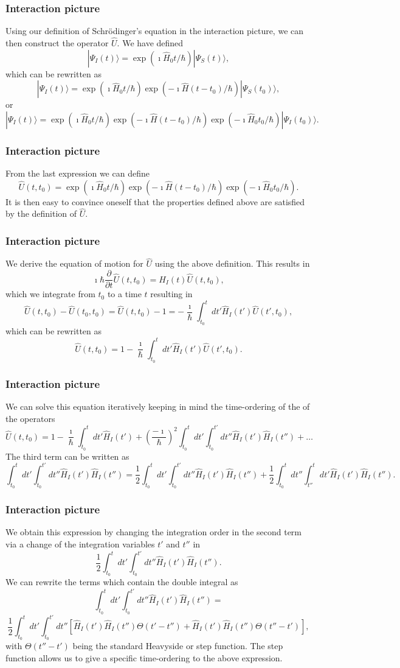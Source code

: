 \frame
{
\frametitle{Interaction picture}
\begin{small}
{\scriptsize
Using our definition of Schr\"odinger's equation in the interaction picture, we can then construct the operator $\hat{U}$. We have defined
\[
|\Psi_I(t)\rangle = \exp{(\imath\hat{H}_0t/\hbar)}|\Psi_S(t)\rangle,
\]
which can be rewritten as 
\[
|\Psi_I(t)\rangle = \exp{(\imath\hat{H}_0t/\hbar)}\exp{(-\imath\hat{H}(t-t_0)/\hbar)}|\Psi_S(t_0)\rangle,
\]
or
\[
|\Psi_I(t)\rangle = \exp{(\imath\hat{H}_0t/\hbar)}\exp{(-\imath\hat{H}(t-t_0)/\hbar)}\exp{(-\imath\hat{H}_0t_0/\hbar)}|\Psi_I(t_0)\rangle.
\]
}
\end{small}
}
\frame
{
\frametitle{Interaction picture}
\begin{small}
{\scriptsize
From the last expression we can define
\[
\hat{U}(t,t_0)=\exp{(\imath\hat{H}_0t/\hbar)}\exp{(-\imath\hat{H}(t-t_0)/\hbar)}\exp{(-\imath\hat{H}_0t_0/\hbar)}.
\]
It is then easy to convince oneself that the properties defined above are satisfied by the definition of $\hat{U}$. 
}
\end{small}
}
\frame
{
\frametitle{Interaction picture}
\begin{small}
{\scriptsize
We derive the equation of motion for $\hat{U}$ using the above definition.
This results in
\[
\imath \hbar\frac{\partial }{\partial t}\hat{U}(t,t_0) = \hat{H}_I(t)\hat{U}(t,t_0),
\]
which we integrate from $t_0$ to a time $t$ resulting in
\[
\hat{U}(t,t_0)-\hat{U}(t_0,t_0)=\hat{U}(t,t_0)-1=-\frac{\imath}{\hbar}\int_{t_0}^t dt' \hat{H}_I(t')\hat{U}(t',t_0),
\]
which can be rewritten as
\[
\hat{U}(t,t_0)=1-\frac{\imath}{\hbar}\int_{t_0}^t dt' \hat{H}_I(t')\hat{U}(t',t_0).
\]
}
\end{small}
}
\frame
{
\frametitle{Interaction picture}
\begin{small}
{\scriptsize
We can solve this equation iteratively keeping in mind the time-ordering of the of the operators
\[
\hat{U}(t,t_0)=1-\frac{\imath}{\hbar}\int_{t_0}^t dt' \hat{H}_I(t')+\left(\frac{-\imath}{\hbar}\right)^2\int_{t_0}^t dt'\int_{t_0}^{t'} dt'' \hat{H}_I(t')\hat{H}_I(t'')+\dots
\]
The third term can be written as 
\[
\int_{t_0}^t dt'\int_{t_0}^{t'} dt'' \hat{H}_I(t')\hat{H}_I(t'')=
\frac{1}{2}\int_{t_0}^t dt'\int_{t_0}^{t'} dt'' \hat{H}_I(t')\hat{H}_I(t'')
+\frac{1}{2}\int_{t_0}^t dt''\int_{t''}^{t} dt' \hat{H}_I(t')\hat{H}_I(t'').
\]
}
\end{small}
}
\frame
{
\frametitle{Interaction picture}
\begin{small}
{\scriptsize
We obtain this expression by changing the integration order in the second term
via a change of the integration variables $t'$ and $t''$  in 
\[
\frac{1}{2}\int_{t_0}^t dt'\int_{t_0}^{t'} dt'' \hat{H}_I(t')\hat{H}_I(t'').
\]
We can rewrite the terms which contain the double integral as
\[
\int_{t_0}^t dt'\int_{t_0}^{t'} dt'' \hat{H}_I(t')\hat{H}_I(t'')=\]
\[
\frac{1}{2}\int_{t_0}^t dt'\int_{t_0}^{t'} dt''\left[\hat{H}_I(t')\hat{H}_I(t'')\Theta(t'-t'')
+\hat{H}_I(t')\hat{H}_I(t'')\Theta(t''-t')\right],
\]
with $\Theta(t''-t')$ being the standard Heavyside or step function. The step function allows us to give a specific time-ordering to the above expression.
}
\end{small}
}
